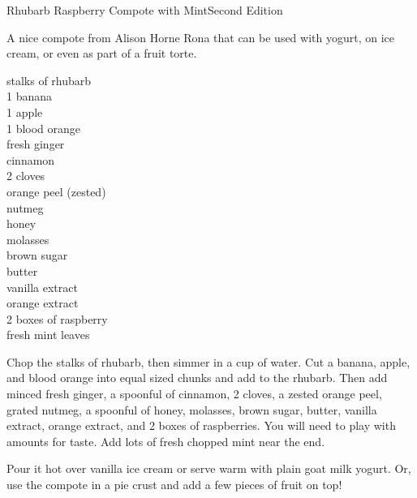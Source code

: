 \begin{entry}{Rhubarb Raspberry Compote with Mint}{Second Edition}

\begin{open}
  A nice compote from Alison Horne Rona that can be used with yogurt, on ice cream,
  or even as part of a fruit torte.
\end{open}
\begin{ingredients}
    stalks of rhubarb\\
    1 banana\\
    1 apple\\
    1 blood orange\\
    fresh ginger\\
    cinnamon\\
    2 cloves\\
    orange peel (zested)\\
    nutmeg\\
    honey\\
    molasses\\
    brown sugar\\
    butter\\
    vanilla extract\\
    orange extract\\
    2 boxes of raspberry\\
    fresh mint leaves
\end{ingredients}
Chop the stalks of rhubarb, then simmer in a cup of water.  Cut a banana,
apple, and blood orange into equal sized chunks and add to the rhubarb.  Then
add minced fresh ginger, a spoonful of cinnamon, 2 cloves, a zested orange peel,
grated nutmeg, a spoonful of honey, molasses, brown sugar, butter, vanilla
extract, orange extract, and 2 boxes of raspberries.  You will need to play with
amounts for taste.  Add lots of fresh chopped mint near the end.

Pour it hot over vanilla ice cream or serve warm with plain goat milk yogurt.
Or, use the compote in a pie crust and add a few pieces of fruit on top!
\end{entry}

